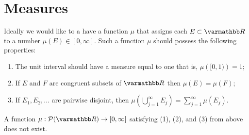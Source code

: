 \chapter{Measures}

Ideally we would like to a have a function $\mu$ that assigns each $E \subset \bfR$ to a number $\mu(E) \in [0,\infty]$. Such a function $\mu$ should possess the following properties:
    \begin{enumerate}[label = \arabic*.,itemsep=1pt,topsep=3pt]
        \item The unit interval should have a measure equal to one \textemdash that is, $\mu \left( [0,1)\right) =1 $;
        \item If $E$ and $F$ are congruent subsets of $\bfR$ then $\mu(E) = \mu(F)$;
        \item If $E_1,E_2,...$ are pairwise disjoint, then $\mu \left( \bigcup_{j = 1}^\infty E_j \right) = \sum_{j = 1}^\infty \mu(E_j)$.
    \end{enumerate}
    \begin{theorem*}
        A function $\mu:\cP(\bfR) \rightarrow [0,\infty]$ satisfying (1), (2), and (3) from above does not exist.
    \end{theorem*}
